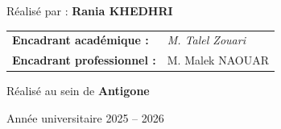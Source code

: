 \begin{titlepage}
\begin{center}
\vspace{1.2cm}

{\large Réalisé par : \textbf{Rania KHEDHRI}}

\vspace{1cm}

\begin{tabular}{ll}
\textbf{Encadrant académique :} &
\textit{M. Talel Zouari}
\\[0.25cm]

\textbf{Encadrant professionnel :} &
M. Malek NAOUAR
\\
\end{tabular}

\vspace{1cm}

{\large Réalisé au sein de \textbf{Antigone}}

\vfill

{\large Année universitaire 2025 -- 2026}

\end{center}
\end{titlepage}